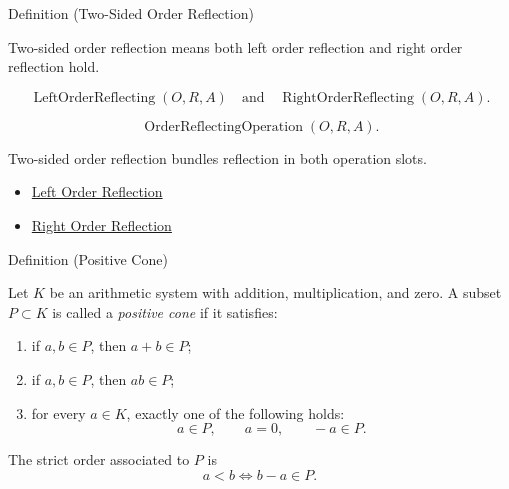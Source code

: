 \begin{definitionbox}{Definition (Two-Sided Order Reflection)}
\begin{definition}
\label{def:two-sided-order-reflection}
Two-sided order reflection means both left order reflection and right order
reflection hold.
\end{definition}
\end{definitionbox}

\begin{remark*}
\[
\operatorname{LeftOrderReflecting}(O,R,A)
\quad\text{and}\quad
\operatorname{RightOrderReflecting}(O,R,A).
\]
\end{remark*}

\begin{remark*}
\[
\operatorname{OrderReflectingOperation}(O,R,A).
\]
\end{remark*}

\begin{remark*}[Interpretation]
Two-sided order reflection bundles reflection in both operation slots.
\end{remark*}

\begin{dependencies}
\begin{itemize}
  \item \hyperref[def:left-order-reflection]{Left Order Reflection}
  \item \hyperref[def:right-order-reflection]{Right Order Reflection}
\end{itemize}
\end{dependencies}

\begin{definitionbox}{Definition (Positive Cone)}
\begin{definition}
\label{def:positive-cone}
Let $K$ be an arithmetic system with addition, multiplication, and zero. A
subset $P\subset K$ is called a \emph{positive cone} if it satisfies:
\begin{enumerate}
  \item if $a,b\in P$, then $a+b\in P$;
  \item if $a,b\in P$, then $ab\in P$;
  \item for every $a\in K$, exactly one of the following holds:
  \[
  a\in P,
  \qquad
  a=0,
  \qquad
  -a\in P.
  \]
\end{enumerate}
The strict order associated to $P$ is
\[
a<b \iff b-a\in P.
\]
\end{definition}
\end{definitionbox}

